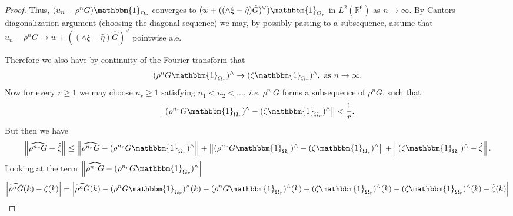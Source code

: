 \documentclass[a4paper,11pt]{article}
\newcommand{\norm}[1]{\left\lVert #1 \right\rVert}
\newcommand{\abs}[1]{\left\lvert #1 \right\rvert}
\newcommand{\ie}{\emph{i.e.} }
\newcommand{\R}{\mathbb{R}}
\numberwithin{equation}{section}
\begin{document}
\begin{proof}
		Thus, $ (u_n-\rho^nG)\mathbbm{1}_{\Omega_r} $ converges to $ (w+((\wedge\xi-\hat{\eta})\hat{G})^\vee)\mathbbm{1}_{\Omega_r}$ in $ L^2(\R^6) $ as $ n\to\infty $. By Cantors diagonalization argument (choosing the diagonal sequence) we may, by possibly passing to a subsequence, assume that  $ u_n-\rho^nG\to w+((\wedge\xi-\hat{\eta})\hat{G})^\vee $ pointwise a.e.
		
		
		
		Therefore we also have by continuity of the Fourier transform that \begin{equation}
		(\rho^nG\mathbbm{1}_{\Omega_r})^\wedge\to (\zeta\mathbbm{1}_{\Omega_r})^\wedge,\text{ as }n\to\infty.
		\end{equation} 
		Now for every $ r\geq 1 $ we may choose $ n_r\geq1 $ satisfying $ n_1<n_2<... $, \ie $ \rho^{n_r}G $ forms a subsequence of $ \rho^nG $, such that \begin{equation}
		\norm{(\rho^{n_r}G\mathbbm{1}_{\Omega_r})^\wedge-(\zeta\mathbbm{1}_{\Omega_r})^\wedge}<\frac{1}{r}.
		\end{equation}
		But then we have \begin{equation}
		\norm{\widehat{\rho^{n_r}G}-\hat{\zeta}}\leq\norm{\widehat{\rho^{n_r}G}-(\rho^{n_r}G\mathbbm{1}_{\Omega_r})^\wedge}+\norm{(\rho^{n_r}G\mathbbm{1}_{\Omega_r})^\wedge-(\zeta\mathbbm{1}_{\Omega_r})^\wedge}+\norm{(\zeta\mathbbm{1}_{\Omega_r})^\wedge-\hat{\zeta}}.
		\end{equation}
	Looking at the term $ \norm{\widehat{\rho^{n_r}G}-(\rho^{n_r}G\mathbbm{1}_{\Omega_r})^\wedge} $
		\begin{equation}
		\abs{\widehat{\rho^nG}(k)-\zeta(k)}=\abs{\widehat{\rho^nG}(k)-(\rho^nG\mathbbm{1}_{\Omega_r})^\wedge(k)+(\rho^nG\mathbbm{1}_{\Omega_r})^\wedge(k)+(\zeta\mathbbm{1}_{\Omega_r})^\wedge(k)-(\zeta\mathbbm{1}_{\Omega_r})^\wedge(k)-\hat{\zeta}(k)}
		\end{equation}
		

\end{proof}
\end{document}
